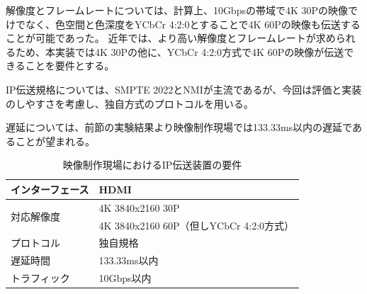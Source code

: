 解像度とフレームレートについては、計算上、10Gbpsの帯域で4K 30Pの映像でけでなく、色空間と色深度をYCbCr 4:2:0とすることで4K 60Pの映像も伝送することが可能であった。
近年では、より高い解像度とフレームレートが求められるため、本実装では4K 30Pの他に、YCbCr 4:2:0方式で4K 60Pの映像が伝送できることを要件とする。

IP伝送規格については、SMPTE 2022とNMIが主流であるが、今回は評価と実装のしやすさを考慮し、独自方式のプロトコルを用いる。

遅延については、前節の実験結果より映像制作現場では133.33ms以内の遅延であることが望まれる。

\begin{table}[htbp]
  \caption{映像制作現場におけるIP伝送装置の要件}
  \label{tb:ip-youken}
  \begin{center}
  \begin{tabular}{l|l}
    \hline
    インターフェース   & HDMI \\\hline
    \multirow{2}{*}{対応解像度} & 4K 3840x2160 30P \\\cline{2-2}
                              & 4K 3840x2160 60P（但しYCbCr 4:2:0方式）  \\\hline
    プロトコル        & 独自規格 \\\hline
    遅延時間          & 133.33ms以内 \\\hline
    トラフィック      & 10Gbps以内 \\\hline
  \end{tabular}\end{center}
\end{table}
